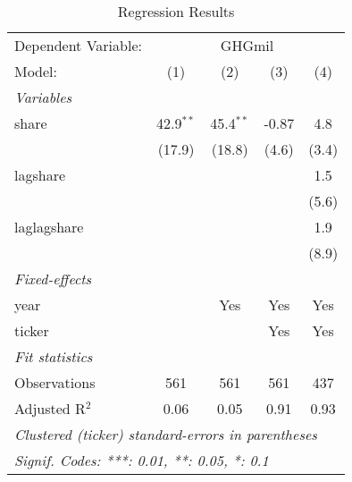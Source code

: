 
\begin{table}[htbp]
   \caption{Regression Results}
   \centering
   \begin{tabular}{lcccc}
      \tabularnewline \midrule \midrule
      Dependent Variable: & \multicolumn{4}{c}{GHGmil}\\
      Model:         & (1)         & (2)         & (3)   & (4)\\  
      \midrule
      \emph{Variables}\\
      share          & 42.9$^{**}$ & 45.4$^{**}$ & -0.87 & 4.8\\   
                     & (17.9)      & (18.8)      & (4.6) & (3.4)\\   
      lagshare       &             &             &       & 1.5\\   
                     &             &             &       & (5.6)\\   
      laglagshare    &             &             &       & 1.9\\   
                     &             &             &       & (8.9)\\   
      \midrule
      \emph{Fixed-effects}\\
      year           &             & Yes         & Yes   & Yes\\  
      ticker         &             &             & Yes   & Yes\\  
      \midrule
      \emph{Fit statistics}\\
      Observations   & 561         & 561         & 561   & 437\\  
      Adjusted R$^2$ & 0.06        & 0.05        & 0.91  & 0.93\\  
      \midrule \midrule
      \multicolumn{5}{l}{\emph{Clustered (ticker) standard-errors in parentheses}}\\
      \multicolumn{5}{l}{\emph{Signif. Codes: ***: 0.01, **: 0.05, *: 0.1}}\\
   \end{tabular}
\end{table}


